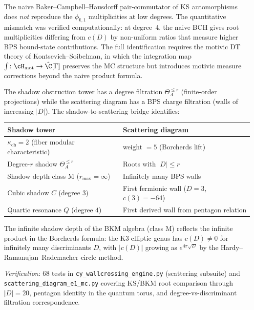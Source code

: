 \begin{warning}
\label{warn:k3e-naive-bch}
The naive Baker--Campbell--Hausdorff pair-commutator of KS automorphisms does \emph{not} reproduce the $\phi_{0,1}$ multiplicities at low degrees. The quantitative mismatch was verified computationally: at degree~$4$, the naive BCH gives root multiplicities differing from $c(D)$ by non-uniform ratios that measure higher BPS bound-state contributions. The full identification requires the motivic DT theory of Kontsevich--Soibelman, in which the integration map $\int \colon \cH_{\mathrm{mot}} \to \hat{\C}[\Gamma]$ preserves the MC structure but introduces motivic measure corrections beyond the naive product formula.
\end{warning}

\begin{remark}
\label{rem:k3e-degree-bps}
The shadow obstruction tower has a degree filtration $\Theta_A^{\leq r}$ (finite-order projections) while the scattering diagram has a BPS charge filtration (walls of increasing $|D|$). The shadow-to-scattering bridge identifies:
\begin{center}
\begin{tabular}{ll}
\textbf{Shadow tower} & \textbf{Scattering diagram} \\ \hline
$\kappa_{\mathrm{ch}} = 2$ (fiber modular characteristic) & weight $= 5$ (Borcherds lift) \\
Degree-$r$ shadow $\Theta_A^{\leq r}$ & Roots with $|D| \leq r$ \\
Shadow depth class M ($r_{\max} = \infty$) & Infinitely many BPS walls \\
Cubic shadow $C$ (degree $3$) & First fermionic wall ($D = 3$, $c(3) = -64$) \\
Quartic resonance $Q$ (degree $4$) & First derived wall from pentagon relation
\end{tabular}
\end{center}
The infinite shadow depth of the BKM algebra (class M) reflects the infinite product in the Borcherds formula: the K3 elliptic genus has $c(D) \neq 0$ for infinitely many discriminants $D$, with $|c(D)|$ growing as $e^{4\pi\sqrt{D}}$ by the Hardy--Ramanujan--Rademacher circle method.
\end{remark}

\noindent\textit{Verification}: 68 tests in \texttt{cy\_wallcrossing\_engine.py} (scattering subsuite) and \texttt{scattering\_diagram\_e1\_mc.py} covering KS/BKM root comparison through $|D| = 20$, pentagon identity in the quantum torus, and degree-vs-discriminant filtration correspondence.


